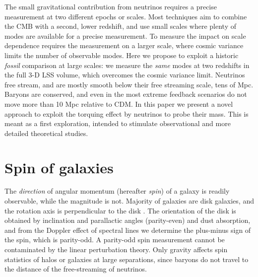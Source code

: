 \documentclass[aps,prd,twocolumn,amsmath,amssymb,amsfont,superscriptaddress,nofootinbib]{revtex4-1}
\newcommand{\tcb}{\textcolor{blue}}
\begin{document}
The small gravitational contribution from neutrinos requires a precise measurement at two different epochs or scales. Most techniques aim to combine the CMB with a second, lower redshift, and use small scales where plenty of modes are available for a precise measurement. To measure the impact on scale dependence requires the measurement on a larger scale, where cosmic variance limits the number of observable modes. Here we propose to exploit a historic {\it fossil} comparison at large scales: we measure the {\it same} modes at two redshifts in the full 3-D LSS volume, which overcomes the cosmic variance limit. Neutrinos free stream, and are mostly smooth below their free streaming scale, tens of Mpc. Baryons are conserved, and even in the most extreme feedback scenarios do not move more than 10 Mpc relative to CDM. In this paper we present a novel approach to exploit the torquing effect by neutrinos to probe their mass. This is meant as a first exploration, intended to stimulate observational and more detailed theoretical studies. 




\section{Spin of galaxies}\label{sec.spin}
The {\it direction} of angular momentum (hereafter {\it spin}) of a galaxy is readily observable, while the magnitude is not. 
Majority of galaxies are disk galaxies, and the rotation axis is perpendicular to the disk \citep{1998MNRAS.297L..71M}. 
The orientation of the disk is obtained by inclination and parallactic angles (parity-even) and dust absorption, and from the Doppler effect of spectral lines we determine the plus-minus sign of the spin, which is parity-odd.
A parity-odd spin measurement cannot be contaminated by the linear perturbation theory. 
Only gravity affects spin statistics of halos or galaxies at large separations, since baryons do not travel to the distance of the free-streaming of neutrinos.
\end{document}
